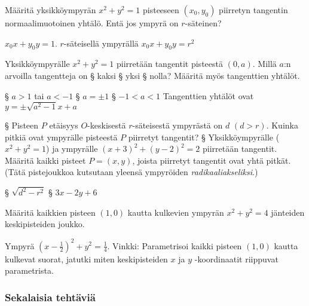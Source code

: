 \begin{tehtavasivu}
\begin{tehtava}
Määritä yksikköympyrän $x^2+y^2= 1$ pisteeseen $(x_{0}, y_{0} )$ piirretyn tangentin normaalimuotoinen yhtälö. Entä jos ympyrä on $r$-säteinen?
\begin{vastaus}
$x_0x+y_0y=1 $. $r$-säteisellä ympyrällä $x_0x+y_0y=r^2$
\end{vastaus}
\end{tehtava}

\begin{tehtava}
Yksikköympyrälle $x^2+y^2=1$ piirretään tangentit pisteestä $(0, a)$. Millä $a$:n arvoilla tangentteja on 
\alakohdat
§ kaksi
§ yksi
§ nolla?
\loppu
Määritä myös tangenttien yhtälöt.
\begin{vastaus}
\alakohdat
§ $a > 1$ tai $a < -1$
§ $a = \pm1$
§ $ -1 < a < 1 $ 
\loppu
Tangenttien yhtälöt ovat $ y = \pm \sqrt{a^2-1}x+a$
\end{vastaus}
\end{tehtava}

\begin{tehtava}
\alakohdat
§ Pisteen $P$ etäisyys $O$-keskisestä $r$-säteisestä ympyrästä on $d$ $(d > r) $. Kuinka pitkiä ovat ympyrälle pisteestä $P$ piirretyt tangentit?
§ Yksikköympyrälle ($x^2+y^2 = 1$) ja ympyrälle $(x+3)^2+(y-2)^2 = 2$ piirretään tangentit. Määritä kaikki pisteet $P = (x,y)$, joista piirretyt tangentit ovat yhtä pitkät. (Tätä pistejoukkoa kutsutaan yleensä ympyröiden \emph{radikaaliakseliksi}.)
\loppu

\begin{vastaus}
\alakohdat
§ $\sqrt{d^2-r^2}$
§ $3x-2y+6$
\loppu
\end{vastaus}
\end{tehtava}

\begin{tehtava}
Määritä kaikkien pisteen $(1,0)$ kautta kulkevien ympyrän $x^2+y^2 = 4$ jänteiden keskipisteiden joukko.
	\begin{vastaus}
		Ympyrä $(x-\frac{1}{2})^2+y^2 = \frac{1}{4}$. Vinkki: Parametrisoi kaikki 			pisteen $(1,0)$ kautta kulkevat suorat, jatutki miten keskipisteiden $x$ ja 		$y$ -koordinaatit riippuvat parametrista.
	\end{vastaus}
\end{tehtava}

\subsubsection*{Sekalaisia tehtäviä}



\end{tehtavasivu}
